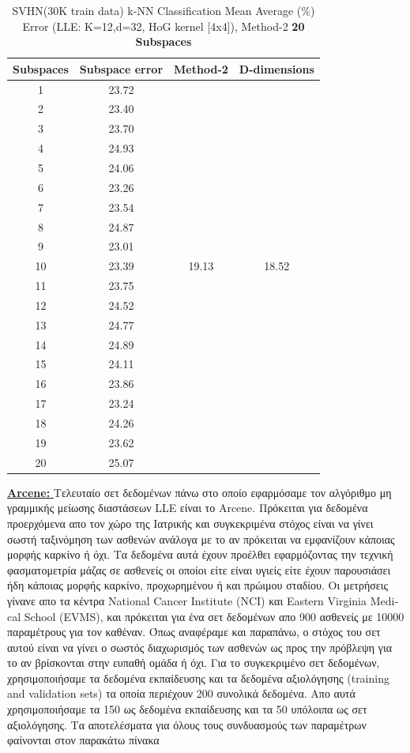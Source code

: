 \begin{table}[H]
\centering
\label{tab:table18}
\begin{tabular}{|c|c|c|c|}
\hline
\textlatin{Subspaces} & \textlatin{Subspace error} & \textlatin{Method-2} & \textlatin{D-dimensions}  \\
\hline
1 & 23.72 & & \\
2 & 23.40 & & \\
3 & 23.70 & & \\
4 & 24.93 & & \\
5 & 24.06 & & \\
6 & 23.26 & & \\
7 & 23.54 &  & \\
8 & 24.87 & & \\
9 & 23.01 &  & \\
10 & 23.39 & 19.13 & 18.52 \\
11 & 23.75 & & \\
12 & 24.52 &  & \\
13 & 24.77 &  & \\
14 & 24.89 & & \\
15 & 24.11 & & \\
16 & 23.86 & & \\
17 & 23.24 &  & \\
18 & 24.26 & & \\
19 & 23.62 &  & \\
20 & 25.07 &  & \\
\hline
\end{tabular}
\caption{\textlatin{SVHN(30K train data) k-NN Classification Mean Average (\%) Error (LLE: K=12,d=32, HoG kernel [4x4]), Method-2 \textbf{20 Subspaces}}}
\end{table}

\par
\href{http://archive.ics.uci.edu/ml/datasets/Arcene}{\textbf{\textlatin{Arcene: }}} Τελευταίο σετ δεδομένων πάνω στο οποίο εφαρμόσαμε τον αλγόριθμο μη γραμμικής μείωσης διαστάσεων \textlatin{LLE} είναι το \textlatin{Arcene}. Πρόκειται για δεδομένα προερχόμενα απο τον χώρο της Ιατρικής και συγκεκριμένα στόχος είναι να γίνει σωστή ταξινόμηση των ασθενών ανάλογα με το αν πρόκειται να εμφανίζουν κάποιας μορφής καρκίνο ή όχι. Τα δεδομένα αυτά έχουν προέλθει εφαρμόζοντας την τεχνική φασματομετρία μάζας σε ασθενείς οι οποίοι είτε είναι υγιείς είτε έχουν παρουσιάσει ήδη κάποιας μορφής καρκίνο, προχωρημένου ή και πρώιμου σταδίου. Οι μετρήσεις γίνανε απο τα κέντρα \textlatin{National Cancer Institute (NCI)} και \textlatin{ Eastern Virginia Medical School (EVMS)}, και πρόκειται για ένα σετ δεδομένων απο 900 ασθενείς με 10000 παραμέτρους για τον καθέναν. Όπως αναφέραμε και παραπάνω, ο στόχος του σετ αυτού είναι να γίνει ο σωστός διαχωρισμός των ασθενών ως προς την πρόβλεψη για το αν βρίσκονται στην ευπαθή ομάδα ή όχι. Για το συγκεκριμένο σετ δεδομένων, χρησιμοποιήσαμε τα δεδομένα εκπαίδευσης και τα δεδομένα αξιολόγησης (\textlatin{training and validation sets}) τα οποία περιέχουν 200 συνολικά δεδομένα. Απο αυτά χρησιμοποιήσαμε τα 150 ως δεδομένα εκπαίδευσης και τα 50 υπόλοιπα ως σετ αξιολόγησης. Τα αποτελέσματα για όλους τους συνδυασμούς των παραμέτρων φαίνονται στον παρακάτω πίνακα

